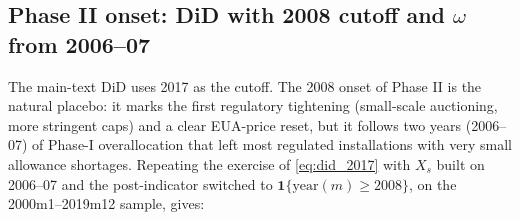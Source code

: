 \subsection{\texorpdfstring{Phase II onset: DiD with 2008 cutoff and $\omega$ from 2006--07}{Phase II onset: DiD with 2008 cutoff and omega from 2006-07}}\label{app:passthrough_p2}

The main-text DiD uses 2017 as the cutoff. The 2008 onset of Phase II is the natural placebo: it marks the first regulatory tightening (small-scale auctioning, more stringent caps) and a clear EUA-price reset, but it follows two years (2006--07) of Phase-I overallocation that left most regulated installations with very small allowance shortages. Repeating the exercise of \eqref{eq:did_2017} with $X_s$ built on 2006--07 and the post-indicator switched to $\mathbf{1}\{\text{year}(m) \geq 2008\}$, on the 2000m1--2019m12 sample, gives:

